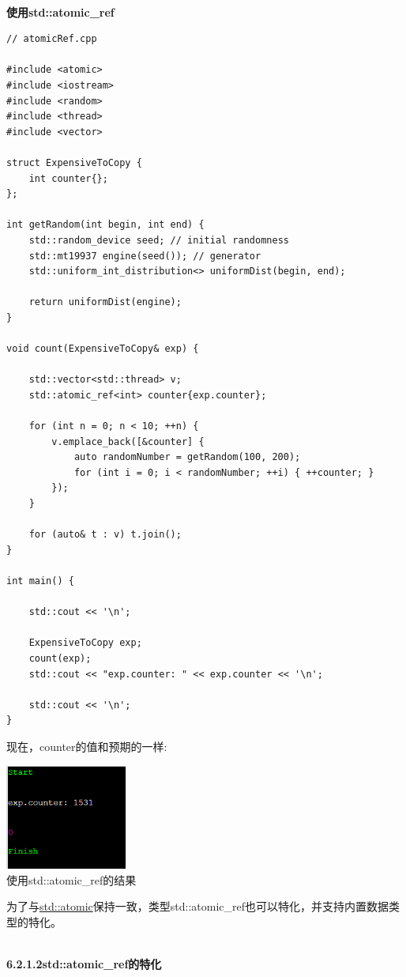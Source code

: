 \hspace*{\fill} \\ %
\noindent
\textbf{使用std::atomic\_ref}
\begin{lstlisting}[style=styleCXX]
// atomicRef.cpp

#include <atomic>
#include <iostream>
#include <random>
#include <thread>
#include <vector>

struct ExpensiveToCopy {
	int counter{};
};

int getRandom(int begin, int end) {
	std::random_device seed; // initial randomness
	std::mt19937 engine(seed()); // generator
	std::uniform_int_distribution<> uniformDist(begin, end);
	
	return uniformDist(engine);
}

void count(ExpensiveToCopy& exp) {
	
	std::vector<std::thread> v;
	std::atomic_ref<int> counter{exp.counter};
	
	for (int n = 0; n < 10; ++n) {
		v.emplace_back([&counter] {
			auto randomNumber = getRandom(100, 200);
			for (int i = 0; i < randomNumber; ++i) { ++counter; }
		});
	}

	for (auto& t : v) t.join();
}

int main() {
	
	std::cout << '\n';
	
	ExpensiveToCopy exp;
	count(exp);
	std::cout << "exp.counter: " << exp.counter << '\n';
	
	std::cout << '\n';
}
\end{lstlisting}

现在，counter的值和预期的一样:

\begin{center}
\includegraphics[width=0.3\textwidth]{content/3/chapter6/images/10.png}\\
使用std::atomic\_ref的结果
\end{center}

为了与\href{https://en.cppreference.com/w/cpp/atomic/atomic}{std::atomic}保持一致，类型std::atomic\_ref也可以特化，并支持内置数据类型的特化。

\hspace*{\fill} \\ %
\noindent
\textbf{6.2.1.2\hspace{0.2cm}std::atomic\_ref的特化}

